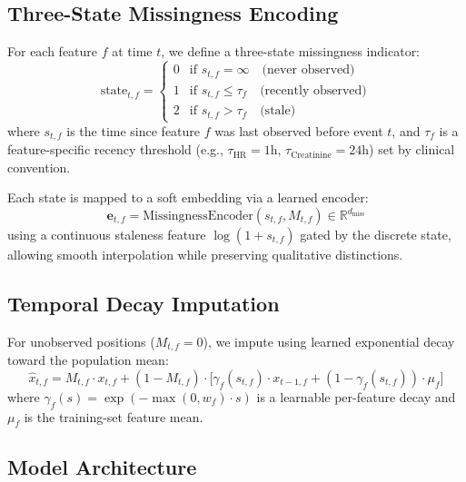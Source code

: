 \documentclass[twoside,11pt]{article}
\begin{document}
\subsection{Three-State Missingness Encoding}
\label{sec:encoding}

For each feature $f$ at time $t$, we define a three-state missingness indicator:
\begin{equation}
  \text{state}_{t,f} = \begin{cases}
    0 & \text{if } s_{t,f} = \infty \quad \text{(never observed)} \\
    1 & \text{if } s_{t,f} \leq \tau_f \quad \text{(recently observed)} \\
    2 & \text{if } s_{t,f} > \tau_f \quad \text{(stale)}
  \end{cases}
  \label{eq:states}
\end{equation}
where $s_{t,f}$ is the time since feature $f$ was last observed before event
$t$, and $\tau_f$ is a feature-specific recency threshold (e.g.,
$\tau_{\text{HR}} = 1\text{h}$, $\tau_{\text{Creatinine}} = 24\text{h}$) set
by clinical convention.

Each state is mapped to a soft embedding via a learned encoder:
\begin{equation}
  \mathbf{e}_{t,f} = \text{MissingnessEncoder}(s_{t,f}, M_{t,f})
  \in \mathbb{R}^{d_\text{miss}}
\end{equation}
using a continuous staleness feature $\log(1 + s_{t,f})$ gated by the discrete
state, allowing smooth interpolation while preserving qualitative distinctions.

\subsection{Temporal Decay Imputation}
\label{sec:imputation}

For unobserved positions ($M_{t,f}=0$), we impute using learned exponential
decay toward the population mean:
\begin{equation}
  \hat{x}_{t,f} = M_{t,f} \cdot x_{t,f}
    + (1 - M_{t,f}) \cdot \bigl[
        \gamma_f(s_{t,f}) \cdot x_{t-1,f}
        + (1-\gamma_f(s_{t,f})) \cdot \mu_f
      \bigr]
\end{equation}
where $\gamma_f(s) = \exp(-\max(0, w_f) \cdot s)$ is a learnable per-feature
decay and $\mu_f$ is the training-set feature mean.

\subsection{Model Architecture}
\label{sec:architecture}
\end{document}
